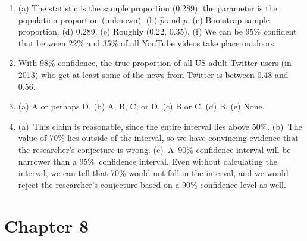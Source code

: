 \documentclass[
  10pt,
  openany]{book}
\providecommand{\tightlist}{%
  \setlength{\itemsep}{0pt}\setlength{\parskip}{0pt}}
\begin{document}
\begin{enumerate}
\def\labelenumi{\arabic{enumi}.}
\tightlist
\item
  (a) The statistic is the sample proportion (0.289); the parameter is the population proportion (unknown). (b) \(\hat{p}\) and \(p\). (c) Bootstrap sample proportion. (d) 0.289. (e) Roughly (0.22, 0.35). (f) We can be 95\% confident that between 22\% and 35\% of all YouTube videos take place outdoors.

  \addtocounter{enumi}{1}
\item
  With 98\% confidence, the true proportion of all US adult Twitter users (in 2013) who get at least some of the news from Twitter is between 0.48 and 0.56.

  \addtocounter{enumi}{1}
\item
  (a) A or perhaps D. (b) A, B, C, or D. (c) B or C. (d) B. (e) None.

  \addtocounter{enumi}{1}
\item
  (a)~This claim is reasonable, since the entire interval lies above 50\%. (b)~The value of 70\% lies outside of the interval, so we have convincing evidence that the researcher's conjecture is wrong. (c)~A~90\% confidence interval will be narrower than a 95\%~confidence interval. Even without calculating the interval, we can tell that 70\% would not fall in the interval, and we would reject the researcher's conjecture based on a 90\% confidence level as well.

  \addtocounter{enumi}{1}
\end{enumerate}

\hypertarget{exercise-solutions-13}{%
\section{Chapter 8}\label{exercise-solutions-13}}
\end{document}
